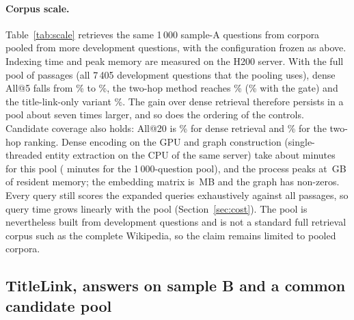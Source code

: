 \documentclass[a4paper,fleqn]{cas-sc}
\begin{document}
\paragraph{Corpus scale.}

Table~\ref{tab:scale} retrieves the same 1\,000 sample-A questions from corpora pooled from more development questions, with the configuration frozen as above. Indexing time and peak memory are measured on the H200 server. With the full pool of \ScaleFullPass{} passages (all 7\,405 development questions that the pooling uses), dense All@5 falls from \ScaleOneDAll\% to \ScaleFullDAll\%, the two-hop method reaches \ScaleFullTAll\% (\ScaleFullGAll\% with the gate) and the title-link-only variant \ScaleFullLAll\%. The gain over dense retrieval therefore persists in a pool about seven times larger, and so does the ordering of the controls. Candidate coverage also holds: All@20 is \ScaleFullDTwenty\% for dense retrieval and \ScaleFullTTwenty\% for the two-hop ranking. Dense encoding on the GPU and graph construction (single-threaded entity extraction on the CPU of the same server) take about \ScaleFullIndexMin{} minutes for this pool (\ScaleOneIndexMin{} minutes for the 1\,000-question pool), and the process peaks at \ScaleFullRSSgb\,GB of resident memory; the embedding matrix is \ScaleFullEmbMB\,MB and the graph has \ScaleFullGraphNNZ{} non-zeros. Every query still scores the expanded queries exhaustively against all passages, so query time grows linearly with the pool (Section~\ref{sec:cost}). The pool is nevertheless built from development questions and is not a standard full retrieval corpus such as the complete Wikipedia, so the claim remains limited to pooled corpora.






\subsection{TitleLink, answers on sample B and a common candidate pool}\label{sec:gpu}



\end{document}
